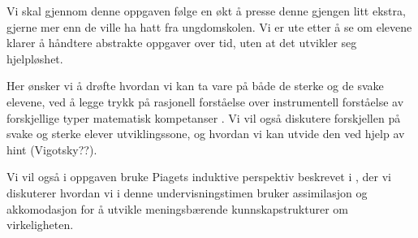 \documentclass[12pt,a4paper]{article}
\begin{document}
Vi skal gjennom denne oppgaven følge en økt å presse denne gjengen litt ekstra, gjerne mer enn de ville ha hatt fra ungdomskolen. Vi er ute etter å se om elevene klarer å håndtere abstrakte oppgaver over tid, uten at det utvikler seg
hjelpløshet.

Her ønsker vi å drøfte hvordan vi kan ta vare på både de sterke og de svake elevene, ved å legge trykk på rasjonell forståelse over instrumentell forståelse  av forskjellige typer matematisk kompetanser \parencite{NissJensen2002}. Vi vil også diskutere forskjellen på svake og
sterke elever utviklingssone, og hvordan vi kan utvide den ved hjelp av hint (Vigotsky??).

Vi vil også i oppgaven bruke Piagets induktive perspektiv beskrevet i \parencite[Side 51]{skaalvik2021skolen}, der vi diskuterer hvordan vi i denne undervisningstimen bruker assimilasjon og akkomodasjon for å utvikle meningsbærende kunnskapstrukturer
om virkeligheten.  
\end{document}

